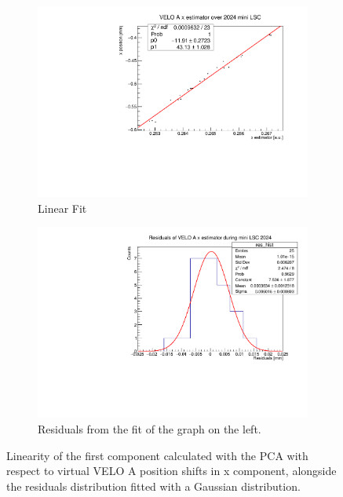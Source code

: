 \begin{figure}
    \centering
    \begin{subfigure}{0.48\textwidth}
    \includegraphics[width=\linewidth]{figures/x_fit_VELO_A_data.pdf}
    \caption{Linear Fit}\label{fig:x_veloA_fit_data}
    \end{subfigure}
    \begin{subfigure}{0.48\textwidth}
    \includegraphics[width=\linewidth]{figures/x_res_VELO_A_data.pdf}
    \caption{Residuals from the fit of the graph on the left. }\label{fig:x_veloA_res_data}
    \end{subfigure}
    \caption{Linearity of the first component calculated with the PCA with respect to virtual VELO A position shifts in x component, alongside the residuals distribution fitted with a Gaussian distribution.}
    \label{fig:x_veloA_data}
\end{figure}



